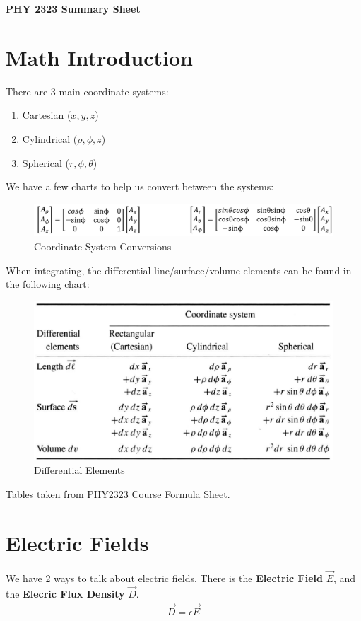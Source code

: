\documentclass[12pt,letterpaper]{article} \usepackage{amsmath} \usepackage{graphicx} \usepackage[margin=1in]{geometry} \usepackage{longtable}  \usepackage{amssymb}
\begin{document}
	
	\begin{center}
		\Large\textbf{PHY 2323 Summary Sheet} \\
		\vspace{0.5em}
	\end{center}
	
	\section{Math Introduction}
	There are 3 main coordinate systems:
	\begin{enumerate}[]
		\item Cartesian ($x,y,z$)
		\item Cylindrical ($\rho, \phi, z$)
		\item Spherical ($r,\phi, \theta$)
	\end{enumerate}

	We have a few charts to help us convert between the systems:
	\begin{figure}[h!]
		\centering
		\includegraphics[width=0.8\linewidth]{trans}
		\caption{Coordinate System Conversions}
		\label{figure:coord-conversions}
	\end{figure}

	When integrating, the differential line/surface/volume elements can be found in the following chart:
	\begin{figure}[h!]
		\centering
		\includegraphics[width=0.7\linewidth]{differential_surfaces}
		\caption{Differential Elements}
		\label{figure:differentials}
	\end{figure}
	
	Tables taken from PHY2323 Course Formula Sheet.
	
	\section{Electric Fields}
	We have 2 ways to talk about electric fields. There is the \textbf{Electric Field} $\vec E$, and the \textbf{Elecric Flux Density }$\vec D$.
	\begin{align*}
		\vec D = \epsilon \vec E
	\end{align*}
	
\end{document}

